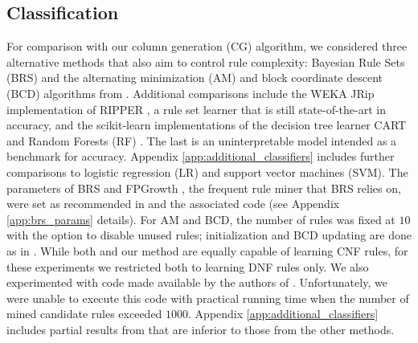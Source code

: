 \documentclass[twoside,11pt]{article}
\begin{document}
    

\subsection{Classification} \label{sec:expClass}
For comparison with our column generation (CG) algorithm, we considered three alternative methods that also aim to control rule complexity: Bayesian Rule Sets (BRS) \citep{wang2017} and the alternating minimization (AM) and block coordinate descent (BCD) algorithms from \cite{su2016}.  Additional comparisons include the WEKA \citep{weka} JRip implementation of RIPPER \citep{cohen1995}, a rule set learner that is still state-of-the-art in accuracy, and the scikit-learn \citep{scikit-learn} implementations of the decision tree learner CART \citep{breiman1984} and Random Forests (RF) \citep{breiman2001}.  The last is an uninterpretable model intended as a benchmark for accuracy.  Appendix \ref{app:additional_classifiers} includes further comparisons to logistic regression (LR) and support vector machines (SVM).  The parameters of BRS and FPGrowth \citep{borgelt2005}, the frequent rule miner that BRS relies on, were set as recommended in \cite{wang2017} and the associated code (see Appendix \ref{app:brs_params} details).  For AM and BCD, the number of rules was fixed at $10$ with the option to disable unused rules; initialization and BCD updating are done as in \cite{su2016}.  While both \cite{su2016} and our method are equally capable of learning CNF rules, for these experiments we restricted both to learning DNF rules only. We also experimented with code made available by the authors of \cite{lakkaraju2016}.  Unfortunately, we were unable to execute this code with practical running time when the number of mined candidate rules exceeded $1000$. Appendix \ref{app:additional_classifiers} includes partial results from \citep{lakkaraju2016} that are inferior to those from the other methods. 
\end{document}
